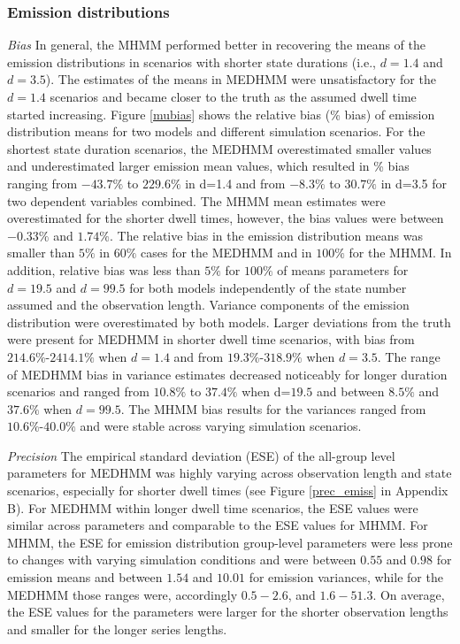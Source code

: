 \subsubsection{Emission distributions}
\emph{Bias}     In general, the MHMM performed better in recovering the means of the emission distributions in scenarios with shorter state durations (i.e., $d=1.4$ and $d=3.5$). The estimates of the means in MEDHMM were unsatisfactory for the $d=1.4$ scenarios and became closer to the truth as the assumed dwell time started increasing. Figure \ref{mubias} shows the relative bias (\% bias) of emission distribution means for two models and different simulation scenarios. For the shortest state duration scenarios, the MEDHMM overestimated smaller values and underestimated larger emission mean values, which resulted in \% bias ranging from $-43.7\%$ to $229.6\%$ in d=1.4 and from $-8.3\%$ to $30.7\%$ in d=3.5 for two dependent variables combined. The MHMM mean estimates were overestimated for the shorter dwell times, however, the bias values were between $-0.33\%$ and $1.74\%$. The relative bias in the emission distribution means was smaller than $5\%$ in $60\%$ cases for the MEDHMM and in $100\%$ for the MHMM. In addition, relative bias was less than $5\%$ for $100\%$ of means parameters for $d=19.5$ and $d=99.5$ for both models independently of the state number assumed and the observation length.
Variance components of the emission distribution were overestimated by both models. Larger deviations from the truth were present for MEDHMM in shorter dwell time scenarios, with bias from $214.6\%$-$2414.1\%$ when $d=1.4$ and from $19.3\%$-$318.9\%$ when $d=3.5$. The range of MEDHMM bias in variance estimates decreased noticeably for longer duration scenarios and ranged from $10.8\%$ to $37.4\%$ when d=$19.5$ and between $8.5\%$ and $37.6\%$ when $d=99.5$. The MHMM bias results for the variances ranged from $10.6\%$-$40.0\%$ and were stable across varying simulation scenarios. 

\emph{Precision}  The empirical standard deviation (ESE) of the all-group level parameters for MEDHMM was highly varying across observation length and state scenarios, especially for shorter dwell times (see Figure \ref{prec_emiss} in Appendix B). For MEDHMM within longer dwell time scenarios, the ESE values were similar across parameters and comparable to the ESE values for MHMM. For MHMM, the ESE for emission distribution group-level parameters were less prone to changes with varying simulation conditions and were between $0.55$ and $0.98$ for emission means and between $1.54$ and
$10.01$ for emission variances, while for the MEDHMM those ranges were, accordingly ${0.5-2.6}$, and ${1.6- 51.3}$. On average, the ESE values for the parameters were larger for the shorter observation lengths and smaller for the longer series lengths. 

